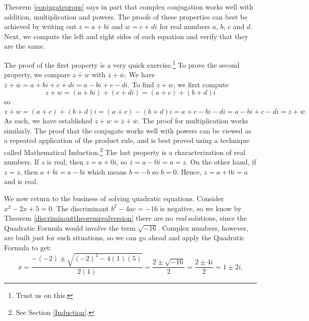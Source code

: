 Theorem \ref{conjugateprops} says in part that complex conjugation works well with addition, multiplication and powers.  The proofs of these properties can best be achieved by writing out $z = a+bi$ and $w = c+di$ for real numbers $a$, $b$, $c$ and $d$.   Next, we compute the left and right sides of each equation and verify that they are the same.  

\smallskip

The proof of the first property is a very quick exercise.\footnote{Trust us on this.}  To prove the second property, we compare $\overline{z+w}$ with $\overline{z} + \overline{w}$.  We have $\overline{z} + \overline{w} = \overline{a+bi} + \overline{c+di}  = a-bi + c-di$.  To find $\overline{z+w}$, we first compute \[z+w = (a+bi) + (c+di) = (a+c)+(b+d)i\] so \[\overline{z+w} = \overline{(a+c)+(b+d)i} = (a+c) - (b+d)i = a+c - bi - di = a - bi + c - di = \overline{z} + \overline{w}\]  As such, we have established  $\overline{z+w} = \overline{z}+\overline{w}$. The proof for multiplication works similarly.  The proof that the conjugate works well with powers can be viewed as a repeated application of the product rule, and is best proved using a technique called Mathematical Induction.\footnote{See Section \ref{Induction}.}  The last property is a characterization of real numbers.  If $z$ is real, then $z = a + 0i$, so $\overline{z} = a - 0i = a = z$.  On the other hand, if $z=\overline{z}$, then $a+bi = a - bi$ which means $b=-b$ so $b=0$.  Hence, $z = a +0i = a$ and is real.

\medskip

We now return to the business of solving quadratic equations. Consider  $x^2-2x+5 = 0$. The discriminant $b^2 - 4ac = -16$ is negative, so we know by Theorem \ref{discriminanttheoremrealversion} there are no \textit{real} solutions, since the Quadratic Formula would involve the term $\sqrt{-16}$.  Complex numbers, however, are built just for such situations, so we can go ahead and apply the Quadratic Formula to get: \[ x = \dfrac{-(-2) \pm \sqrt{(-2)^2-4(1)(5)}}{2(1)} = \dfrac{2 \pm \sqrt{-16}}{2} = \dfrac{2 \pm 4i}{2} = 1 \pm 2i.\]  

